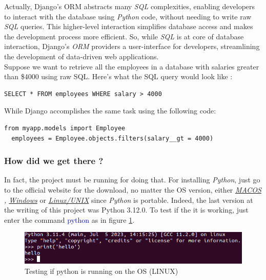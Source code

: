 \documentclass[12pt,a4paper]{report}
\begin{document}
	Actually, Django's ORM abstracts many \textit{SQL} complexities, enabling developers to interact with the database using \textit{Python} code, without needing to write raw \textit{SQL} queries. This higher-level interaction simplifies database access and makes the development process more efficient. So, while \textit{SQL} is at core of database interaction, Django's \textit{ORM} providers a user-interface for developers, streamlining the development of data-driven web applications.\\ 
	Suppose we want to retrieve all the employees in a database with salaries greater than \$4000 using raw SQL. Here's what the SQL query would look like : 	
\begin{lstlisting}[style=stylepython]
 SELECT * FROM employees WHERE salary > 4000
\end{lstlisting}
  While Django accomplishes the same task using the following code:
\begin{lstlisting}[style=stylepython]
from myapp.models import Employee
  employees = Employee.objects.filters(salary__gt = 4000)
\end{lstlisting}
    \subsubsection*{How did we get there ?}
   In fact, the project must be running for doing that. For installing \textit{Python}, just go to the official website for the  download, no matter the OS version, either \textit{ \href{https://www.python.org/downloads/macos/}{MACOS} , \href{https://www.python.org/downloads/windows/}{Windows} } or \href{https://www.python.org/downloads/source/}{\textit{Linux/UNIX}} since \textit{Python} is portable. Indeed, the last version at the writing of this project was Python 3.12.0. To test if the it is working, just enter the command \textcolor{blue}{python} as in figure \ref{fig:testpython}.
   \begin{figure}
   	\centering
   	\includegraphics[width=1\linewidth]{testPython}
   	\caption{Testing if python is running on the OS (LINUX)}
   	\label{fig:testpython}
   \end{figure}
   
\end{document}
